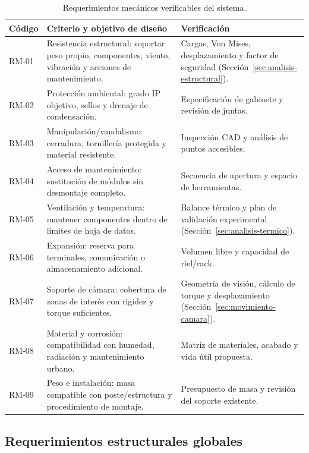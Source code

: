 \begin{table}[H]
  \centering
  \footnotesize
  \caption{Requerimientos mecánicos verificables del sistema.}
  \label{tab:requerimientos-mecanicos}
  \begin{tabularx}{\linewidth}{@{}l X X@{}}
    \toprule
    \textbf{Código} & \textbf{Criterio y objetivo de diseño} & \textbf{Verificación} \\
    \midrule
    RM-01 & Resistencia estructural: soportar peso propio, componentes, viento, vibración y acciones de mantenimiento. & Cargas, Von Mises, desplazamiento y factor de seguridad (Sección~\ref{sec:analisis-estructural}). \\
    RM-02 & Protección ambiental: grado IP objetivo, sellos y drenaje de condensación. & Especificación de gabinete y revisión de juntas. \\
    RM-03 & Manipulación/vandalismo: cerradura, tornillería protegida y material resistente. & Inspección CAD y análisis de puntos accesibles. \\
    RM-04 & Acceso de mantenimiento: sustitución de módulos sin desmontaje completo. & Secuencia de apertura y espacio de herramientas. \\
    RM-05 & Ventilación y temperatura: mantener componentes dentro de límites de hoja de datos. & Balance térmico y plan de validación experimental (Sección~\ref{sec:analisis-termico}). \\
    RM-06 & Expansión: reserva para terminales, comunicación o almacenamiento adicional. & Volumen libre y capacidad de riel/rack. \\
    RM-07 & Soporte de cámara: cobertura de zonas de interés con rigidez y torque suficientes. & Geometría de visión, cálculo de torque y desplazamiento (Sección~\ref{sec:movimiento-camara}). \\
    RM-08 & Material y corrosión: compatibilidad con humedad, radiación y mantenimiento urbano. & Matriz de materiales, acabado y vida útil propuesta. \\
    RM-09 & Peso e instalación: masa compatible con poste/estructura y procedimiento de montaje. & Presupuesto de masa y revisión del soporte existente. \\
    \bottomrule
  \end{tabularx}
\end{table}

\subsection{Requerimientos estructurales globales}\label{subsec:requerimientos-estructurales}

